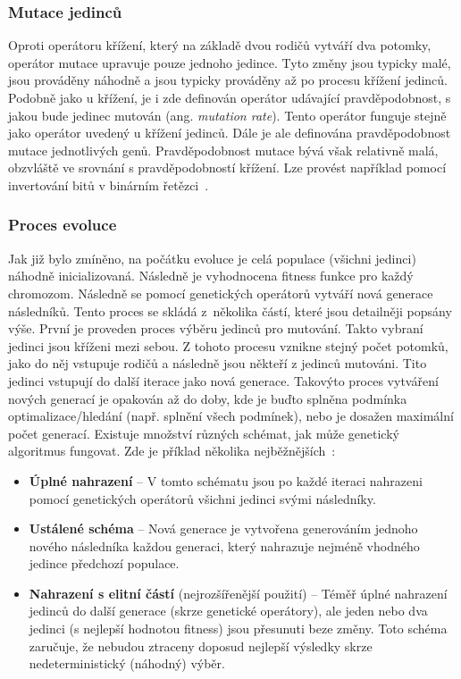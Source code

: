 \subsubsection{Mutace jedinců}
\label{mutaceGA}
Oproti operátoru křížení, který na základě dvou rodičů vytváří dva potomky, operátor mutace upravuje pouze jednoho jedince. Tyto změny jsou typicky malé, jsou prováděny náhodně a jsou typicky prováděny až po procesu křížení jedinců. Podobně jako u křížení, je i zde definován operátor udávající pravděpodobnost, s jakou bude jedinec mutován (ang. \emph{mutation rate}). Tento operátor funguje stejně jako operátor uvedený u křížení jedinců. Dále je ale definována pravděpodobnost mutace jednotlivých genů. Pravděpodobnost mutace bývá však relativně malá, obzvláště ve srovnání s pravděpodobností křížení. Lze provést například pomocí invertování bitů v binárním řetězci~\cite{GAoptimisModel, GAstudy}.


\subsubsection{Proces evoluce}
Jak již bylo zmíněno, na počátku evoluce je celá populace (všichni jedinci) náhodně inicializovaná. Následně je vyhodnocena fitness funkce pro každý chromozom. Následně se pomocí genetických operátorů vytváří nová generace následníků. Tento proces se skládá z~několika částí, které jsou detailněji popsány výše. První je proveden proces výběru jedinců pro mutování. Takto vybraní jedinci jsou kříženi mezi sebou. Z tohoto procesu vznikne stejný počet potomků, jako do něj vstupuje rodičů a následně jsou někteří z jedinců mutováni. Tito jedinci vstupují do další iterace jako nová generace. Takovýto proces vytváření nových generací je opakován až do doby, kde je buďto splněna podmínka optimalizace/hledání (např. splnění všech podmínek), nebo je dosažen maximální počet generací. Existuje množství různých schémat, jak může genetický algoritmus fungovat. Zde je příklad několika nejběžnějších~\cite{GAoptimisModel, introductionEvo}:

\begin{itemize}
    \item \textbf{Úplné nahrazení} -- V tomto schématu jsou po každé iteraci nahrazeni pomocí genetických operátorů všichni jedinci svými následníky.
    \item \textbf{Ustálené schéma} -- Nová generace je vytvořena generováním jednoho nového následníka každou generaci, který nahrazuje nejméně vhodného jedince předchozí populace.
    \item \textbf{Nahrazení s elitní částí} (nejrozšířenější použití) -- Téměř úplné nahrazení jedinců do další generace (skrze genetické operátory), ale jeden nebo dva jedinci (s nejlepší hodnotou fitness) jsou přesunuti beze změny. Toto schéma zaručuje, že nebudou ztraceny doposud nejlepší výsledky skrze nedeterministický (náhodný) výběr.
\end{itemize}

